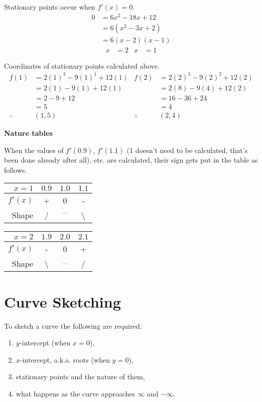 Stationary points occur when $f'(x)=0$.
\begin{align*}
	0 &= 6x^2-18x+12\\
	&= 6(x^2-3x+2)\\
	&= 6(x-2)(x-1)
\end{align*}
\begin{align*}
	x&=2 & x&=1
\end{align*}

Coordinates of stationary points calculated above.
\begin{align*}
	f(1) &= 2(1)^3-9(1)^1+12(1) & f(2) &= 2(2)^3-9(2)^2+12(2)\\
	&= 2(1)-9(1)+12(1) & &= 2(8)-9(4)+12(2)\\
	&= 2-9+12 & &= 16-36+24\\
	&= 5 & &=4\\
	\therefore &(1,5) & \therefore &(2,4)
\end{align*}

\textbf{Nature tables}

When the values of $f'(0.9)$, $f'(1.1)$ (1 doesn't need to be calculated, that's been done already after all), etc. are calculated, their sign gets put in the table as follows.

\medskip

\begin{tabular}{r | c c c}
	$x=1$ & $0.9$ & $1.0$ & $1.1$\\
	\hline
	$f'(x)$ & + & 0 & -\\
	Shape & / & $^{\text{---}}$ & \textbackslash \\
\end{tabular}

\medskip

\begin{tabular}{r | c c c}
	$x=2$ & $1.9$ & $2.0$ & $2.1$\\
	\hline
	$f'(x)$ & - & 0 & +\\
	Shape & \textbackslash & $_{\text{---}}$ & / \\
\end{tabular}


\section{Curve Sketching}
To sketch a curve the following are required:
\begin{enumerate}
	\item $y$-intercept (when $x=0$),
	\item $x$-intercept, a.k.a. roots (when $y=0$),
	\item stationary points and the nature of them,
	\item what happens as the curve approaches $\infty$ and $-\infty$.
\end{enumerate}

